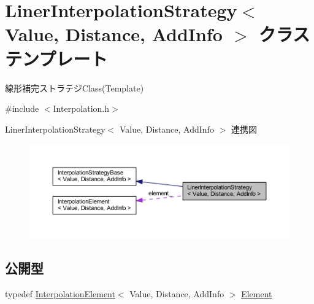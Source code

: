 \hypertarget{class_liner_interpolation_strategy}{}\section{Liner\+Interpolation\+Strategy$<$ Value, Distance, Add\+Info $>$ クラステンプレート}
\label{class_liner_interpolation_strategy}


線形補完ストラテジ\+Class(\+Template)  




{\ttfamily \#include $<$Interpolation.\+h$>$}



Liner\+Interpolation\+Strategy$<$ Value, Distance, Add\+Info $>$ 連携図\nopagebreak
\begin{figure}[H]
\begin{center}
\leavevmode
\includegraphics[width=350pt]{class_liner_interpolation_strategy__coll__graph}
\end{center}
\end{figure}
\subsection*{公開型}
\begin{DoxyCompactItemize}
\item 
typedef \mbox{\hyperlink{class_interpolation_element}{Interpolation\+Element}}$<$ Value, Distance, Add\+Info $>$ \mbox{\hyperlink{class_liner_interpolation_strategy_acbc8878179146c4a0f3ab0eb75c9d229}{Element}}
\end{DoxyCompactItemize}

